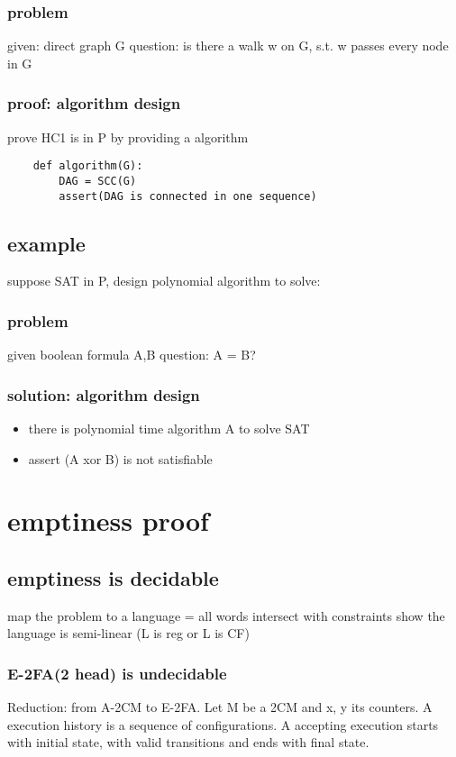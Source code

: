 \documentclass{article}
\begin{document}
\subsubsection{problem}
given: direct graph G
question: is there a walk w on G, s.t. w passes every node in G

\subsubsection{proof: algorithm design}
prove HC1 is in P by providing a algorithm
\begin{lstlisting}
	def algorithm(G):
		DAG = SCC(G)
		assert(DAG is connected in one sequence)
\end{lstlisting}

\subsection{example}
suppose SAT in P, design polynomial algorithm to solve:

\subsubsection{problem}
given boolean formula A,B
question: A = B?

\subsubsection{solution: algorithm design}
\begin{itemize}
	\item there is polynomial time algorithm A to solve SAT
	\item assert (A xor B) is not satisfiable
\end{itemize}

\section{emptiness proof}

\subsection{emptiness is decidable}
map the problem to a language = all words intersect with constraints
show the language is semi-linear (L is reg or L is CF)

\subsubsection{E-2FA(2 head) is undecidable}
Reduction: from A-2CM to E-2FA. Let M be a 2CM and x, y its counters. A execution history is a sequence of configurations. A accepting execution starts with initial state, with valid transitions and ends with final state.
\end{document}

